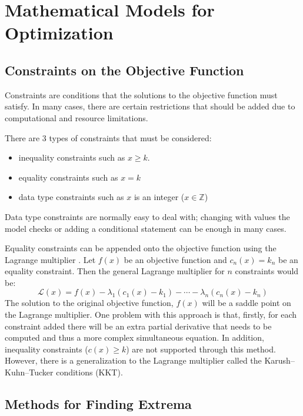 \documentclass[10pt,a4paper]{report}
\begin{document}
	\chapter{Mathematical Models for Optimization}

		\section{Constraints on the Objective Function}
			Constraints are conditions that the solutions to the objective function must satisfy. In many cases, there are
			certain restrictions that should be added due to computational and resource limitations. \par
			There are 3 types of constraints that must be considered:
			\begin{itemize}
				\item inequality constraints such as $x \geq k$.
				\item equality constraints such as $x = k$
				\item data type constraints such as $x$ is an integer ($x \in \mathbb{Z}$)
			\end{itemize}
			Data type constraints are normally easy to deal with; changing with values the model checks or adding a conditional statement
			can be enough in many cases. \par
			Equality constraints can be appended onto the objective function using the Lagrange multiplier \autocite{LagrangeMultiplier}. Let
			$f(x)$ be an objective function and $c_{n}(x) = k_n$ be an equality constraint. Then the general Lagrange multiplier for $n$ constraints would be:
			\begin{equation}
				\mathcal{L} (x) = f(x) - \lambda_1(c_{1}(x) - k_1) - \cdots - \lambda_n(c_{n}(x) - k_n)
			\end{equation}
			The solution to the original objective function, $f(x)$ will be a saddle point on the Lagrange multiplier. One problem with this
			approach is that, firstly, for each constraint added there will be an extra partial derivative that needs to be computed and thus a more
			complex simultaneous equation. In addition, inequality constraints ($c(x) \geq k$) are not supported through this method. However, there
			is a generalization to the Lagrange multiplier called the Karush–Kuhn–Tucker conditions (KKT).

		\section{Methods for Finding Extrema}
\end{document}
